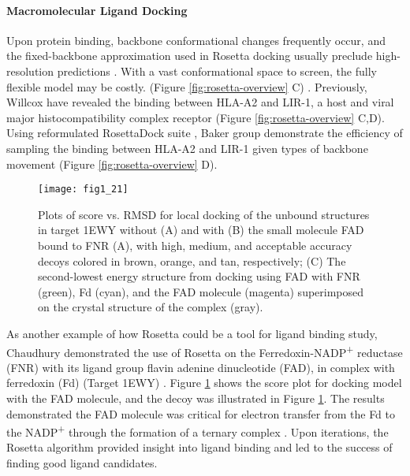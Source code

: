 \begin{refsection}
\paragraph{Macromolecular Ligand Docking}

Upon protein binding, backbone conformational changes frequently occur, and the
fixed-backbone approximation used in Rosetta docking usually preclude
high-resolution predictions \cite{Das2008}. With a vast conformational space to
screen, the fully flexible model may be costly. (Figure
\ref{fig:rosetta-overview} C) \cite{Wang2007a}. Previously, Willcox  have revealed the binding between HLA-A2 and LIR-1, a host and viral major
histocompatibility complex receptor \cite{Willcox2003} (Figure
\ref{fig:rosetta-overview} C,D). Using reformulated RosettaDock suite
\cite{Wang2007a}, Baker group demonstrate the efficiency of sampling the
binding between HLA-A2 and LIR-1 given types of backbone movement
\cite{Wang2007a} (Figure \ref{fig:rosetta-overview} D). 
\begin{figure}[htbp] \centering \texttt{[image: fig1\_21]}
    \caption[Plots of score vs. RMSD for local docking of the unbound
        structures in target 1EWY without (A) and with (B) the small molecule
        FAD bound to FNR (A), with high, medium, and acceptable accuracy decoys
        colored in brown, orange, and tan, respectively; (C) The second-lowest
        energy structure from docking using FAD with FNR (green), Fd (cyan),
        and the FAD molecule (magenta) superimposed on the crystal structure of
    the complex (gray)] {Plots of score vs. RMSD for local docking of the
        unbound structures in target 1EWY without (A) and with (B) the small
        molecule FAD bound to FNR (A), with high, medium, and acceptable
        accuracy decoys colored in brown, orange, and tan, respectively; (C)
        The second-lowest energy structure from docking using FAD with FNR
        (green), Fd (cyan), and the FAD molecule (magenta) superimposed on the
        crystal structure of the complex (gray)\cite{Chaudhury2011}.} 
        \label{fig:macro-ligand} 
\end{figure}

As another example of how Rosetta could be a tool for ligand binding study, 
Chaudhury  demonstrated the use of Rosetta on the
Ferredoxin-NADP\textsuperscript{+} reductase (FNR) with its ligand group flavin
adenine dinucleotide (FAD), in complex with ferredoxin (Fd) (Target
1EWY) \cite{Chaudhury2011}. Figure \ref{fig:macro-ligand} shows the score plot
for docking model with the FAD molecule, and the decoy was illustrated in Figure
\ref{fig:macro-ligand}. The results demonstrated the FAD molecule was critical for
electron transfer from the Fd to the NADP\textsuperscript{+} through the
formation of a ternary complex \cite{Hermoso2002}.  Upon iterations, the
Rosetta algorithm provided insight into ligand binding and led to the success
of finding good ligand candidates.


\end{refsection}

